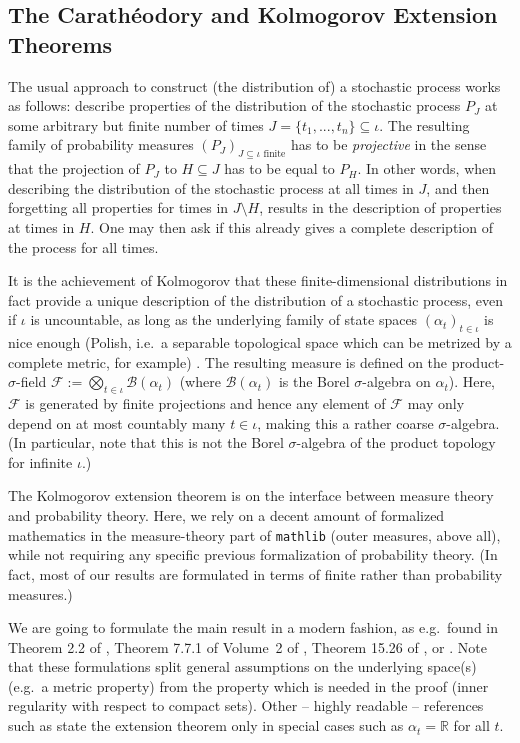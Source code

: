 \documentclass[lean]{Draft}
\begin{document}
\subsection{The Carathéodory and Kolmogorov Extension Theorems}
The usual approach to construct (the distribution of) a stochastic process works as follows: describe properties of the distribution of the stochastic process $P_J$ at some arbitrary but finite number of times $J = \{t_1,...,t_n\} \subseteq \iota$.
The resulting family of probability measures $(P_J)_{J \subseteq \iota \text{ finite}}$ has to be {\em projective} in the sense that the projection of $P_J$ to $H\subseteq J$ has to be equal to $P_H$. In other words, when describing the distribution of the stochastic process at all times in $J$, and then forgetting all properties for times in $J\setminus H$, results in the description of properties at times in $H$. One may then ask if this already gives a complete description of the process for all times.

It is the achievement of Kolmogorov that these finite-dimensional distributions in fact provide a unique description of the distribution of a stochastic process, even if $\iota$ is uncountable, as long as the underlying family of state spaces $(\alpha_t)_{t\in\iota}$ is nice enough (Polish, i.e.\ a separable topological space which can be metrized by a complete metric, for example) \cite{kolmogoroff1933grundbegriffe}.
The resulting measure is defined on the product-$\sigma$-field $\mathcal F :=\bigotimes_{t\in\iota} \mathcal B(\alpha_t)$ (where $\mathcal B(\alpha_t)$ is the Borel $\sigma$-algebra on $\alpha_t$). Here, $\mathcal F$ is generated by finite projections and hence any element of $\mathcal F$ may only depend on at most countably many $t\in \iota$, making this a rather coarse $\sigma$-algebra. (In particular, note that this is not the Borel $\sigma$-algebra of the product topology for infinite $\iota$.)

The Kolmogorov extension theorem is on the interface between measure theory and probability theory. Here, we rely on a decent amount of formalized mathematics in the measure-theory part of {\tt mathlib} (outer measures, above all), while not requiring any specific previous formalization of probability theory. (In fact, most of our results are formulated in terms of finite rather than probability measures.)

We are going to formulate the main result in a modern fashion, as e.g.\ found in Theorem 2.2 of \cite{rao1971projective}, Theorem 7.7.1 of Volume~2 of \cite{bogachev2007measure}, Theorem 15.26 of \cite{guide2006infinite}, or \cite{border1998expository}. Note that these formulations split general assumptions on the underlying space(s) (e.g.\ a metric property) from the property which is needed in the proof (inner regularity with respect to compact sets). Other -- highly readable -- references such as \cite{Billingsley1995} state the extension theorem only in special cases such as $\alpha_t = \mathbb R$ for all $t$.
\end{document}
